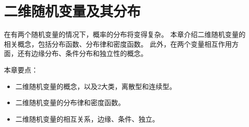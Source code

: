 \chapter{二维随机变量及其分布}

在有两个随机变量的情况下，概率的分布将变得复杂。
本章介绍二维随机变量的相关概念，包括分布函数、分布律和密度函数。
此外，在两个变量相互作用方面，还有边缘分布、条件分布和独立性的概念。

本章要点：
\begin{itemize}
    \item 二维随机变量的概念，以及2大类，离散型和连续型。
    \item 二维随机变量的分布律和密度函数。
    \item 二维随机变量的相互关系，边缘、条件、独立。
\end{itemize}

\newpage


\newpage


\newpage


\newpage


\newpage


\newpage


\newpage


\newpage


\newpage


\newpage


\newpage





